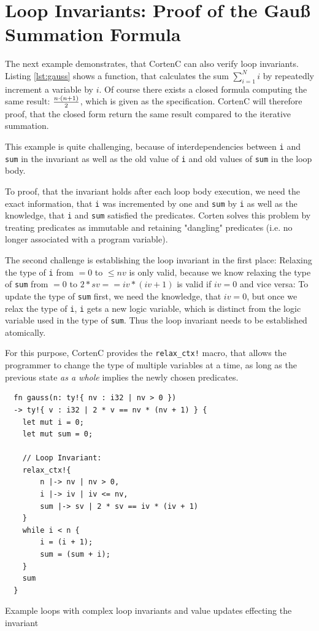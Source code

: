 \documentclass{book}
\newcommand{\code}[1]{\texttt{#1}}
\theoremstyle{definition}
\begin{document}
\label{sec:evaluation-gauss} \section{Loop Invariants: Proof of the Gauß Summation Formula}

The next example demonstrates, that CortenC can also verify loop invariants. Listing \ref{lst:gauss} shows a function, that calculates the sum $\sum_{i = 1}^N i$ by repeatedly increment a variable by $i$. 
Of course there exists a closed formula computing the same result: $n \cdot (n + 1) \over 2$, which is given as the specification. CortenC will therefore proof, that the closed form return the same result compared to the iterative summation.

This example is quite challenging, because of interdependencies between \code{i} and \code{sum} in the invariant as well as the old value of \code{i} and old values of \code{sum} in the loop body. 

To proof, that the invariant holds after each loop body execution, we need the exact information, that \code{i} was incremented by one and \code{sum} by \code{i} as well as the knowledge, that \code{i} and \code{sum} satisfied the predicates. Corten solves this problem by treating predicates as immutable and retaining "dangling" predicates (i.e. no longer associated with a program variable).

The second challenge is establishing the loop invariant in the first place: Relaxing the type of \code{i} from $= 0$ to $\leq nv$ is only valid, because we know relaxing the type of \code{sum} from $= 0$ to $ 2 * sv == iv * (iv + 1)$ is valid if $iv = 0$ and vice versa: To update the type of \code{sum} first, we need the knowledge, that $iv = 0$, but once we relax the type of \code{i}, \code{i} gets a new logic variable, which is distinct from the logic variable used in the type of \code{sum}. Thus the loop invariant needs to be established atomically.

For this purpose, CortenC provides the \code{relax\_ctx!} macro, that allows the programmer to change the type of multiple variables at a time, as long as the previous state \textit{as a whole} implies the newly chosen predicates.

\begin{listing}[ht]
  \begin{verbatim}
  fn gauss(n: ty!{ nv : i32 | nv > 0 }) 
  -> ty!{ v : i32 | 2 * v == nv * (nv + 1) } {
    let mut i = 0;
    let mut sum = 0;
    
    // Loop Invariant:
    relax_ctx!{
        n |-> nv | nv > 0,
        i |-> iv | iv <= nv,
        sum |-> sv | 2 * sv == iv * (iv + 1)
    }
    while i < n {
        i = (i + 1);
        sum = (sum + i);
    }
    sum
  }
  \end{verbatim}
  \caption{Example loops with complex loop invariants and value updates effecting the invariant}
  \label{lst:gauss}
\end{listing}
\end{document}
